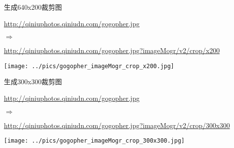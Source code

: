 \documentclass[11pt, oneside]{book}
\newcommand{\qpar}[1]{
\vspace{0.25em}
\noindent
#1\par
\vspace{0.25em}
}
\newcommand{\qurl}[1]{\url{#1}}
\begin{document}
\begin{CJK*}{UTF8}{song}
\begin{sample}
  \caption{生成640x200裁剪图}
    \qpar{\qurl{http://qiniuphotos.qiniudn.com/gogopher.jpg}}
    \qpar{$\Rightarrow$}
    \qpar{\qurl{http://qiniuphotos.qiniudn.com/gogopher.jpg?imageMogr/v2/crop/x200}}

    \begin{center}
      \texttt{[image: ../pics/gogopher\_imageMogr\_crop\_x200.jpg]}
    \end{center}
  \label{imageMogr-crop-x200}
\end{sample}

\begin{sample}
  \caption{生成300x300裁剪图}
    \qpar{\qurl{http://qiniuphotos.qiniudn.com/gogopher.jpg}}
    \qpar{$\Rightarrow$}
    \qpar{\qurl{http://qiniuphotos.qiniudn.com/gogopher.jpg?imageMogr/v2/crop/300x300}}

    \begin{center}
      \texttt{[image: ../pics/gogopher\_imageMogr\_crop\_300x300.jpg]}
    \end{center}
  \label{imageMogr-crop-300x300}
\end{sample}

\end{CJK*}
\end{document}
